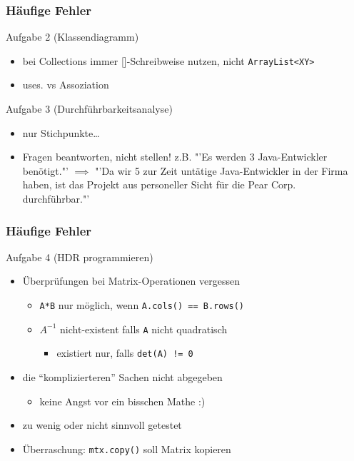 \documentclass[18pt]{beamer}
\begin{document}
\begin{frame}
\frametitle{Häufige Fehler}
\begin{block}{Aufgabe 2 (Klassendiagramm)}
	\begin{itemize}
		\item bei Collections immer []-Schreibweise nutzen, nicht \texttt{ArrayList<XY>}
		\pause
		\item uses. vs Assoziation
	\end{itemize}
\end{block}
\pause
	\begin{block}{Aufgabe 3 (Durchführbarkeitsanalyse)}
	\begin{itemize}
		\item nur Stichpunkte\dots
		\pause
		\item Fragen beantworten, nicht stellen!
		\linebreak z.B. "'Es werden 3 Java-Entwickler benötigt."' $\implies$
		"'Da wir 5 zur Zeit untätige Java-Entwickler in der Firma haben, ist das Projekt aus personeller Sicht für die Pear Corp. durchführbar."'
	\end{itemize}
\end{block}
\end{frame}

\begin{frame}
		\frametitle{Häufige Fehler}
		\begin{block}{Aufgabe 4 (HDR programmieren)}
			\begin{itemize}
				\item Überprüfungen bei Matrix-Operationen vergessen
				\begin{itemize}
					\item \texttt{A*B} nur möglich, wenn \texttt{A.cols() == B.rows()}
					\item \texttt{$A^{-1}$} nicht-existent falls \texttt{A} nicht quadratisch
					\begin{itemize}
						\item existiert nur, falls \texttt{det(A) != 0}
					\end{itemize}
				\end{itemize}
				\pause
				\item die \enquote{komplizierteren} Sachen nicht abgegeben
				\begin{itemize}
					\item keine Angst vor ein bisschen Mathe :)
				\end{itemize}
				\pause
				\item zu wenig oder nicht sinnvoll getestet
				\pause
				\item Überraschung: \texttt{mtx.copy()} soll Matrix kopieren
			\end{itemize}
		\end{block}
	

\end{frame}
\end{document}
